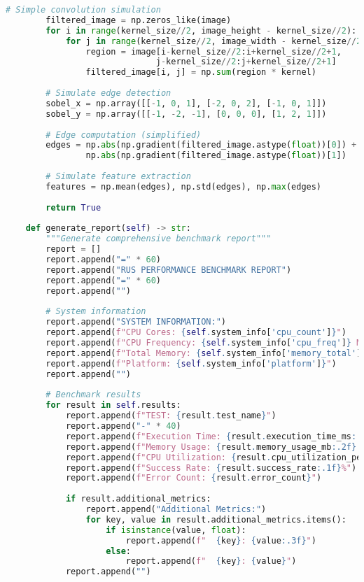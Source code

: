 \begin{lstlisting}[language=Python, caption={Performance Benchmark Script}, label={lst:app-benchmark-script}]
        # Simple convolution simulation
        filtered_image = np.zeros_like(image)
        for i in range(kernel_size//2, image_height - kernel_size//2):
            for j in range(kernel_size//2, image_width - kernel_size//2):
                region = image[i-kernel_size//2:i+kernel_size//2+1, 
                              j-kernel_size//2:j+kernel_size//2+1]
                filtered_image[i, j] = np.sum(region * kernel)
        
        # Simulate edge detection
        sobel_x = np.array([[-1, 0, 1], [-2, 0, 2], [-1, 0, 1]])
        sobel_y = np.array([[-1, -2, -1], [0, 0, 0], [1, 2, 1]])
        
        # Edge computation (simplified)
        edges = np.abs(np.gradient(filtered_image.astype(float))[0]) + \
                np.abs(np.gradient(filtered_image.astype(float))[1])
        
        # Simulate feature extraction
        features = np.mean(edges), np.std(edges), np.max(edges)
        
        return True
    
    def generate_report(self) -> str:
        """Generate comprehensive benchmark report"""
        report = []
        report.append("=" * 60)
        report.append("RUS PERFORMANCE BENCHMARK REPORT")
        report.append("=" * 60)
        report.append("")
        
        # System information
        report.append("SYSTEM INFORMATION:")
        report.append(f"CPU Cores: {self.system_info['cpu_count']}")
        report.append(f"CPU Frequency: {self.system_info['cpu_freq']} MHz")
        report.append(f"Total Memory: {self.system_info['memory_total']:.1f} GB")
        report.append(f"Platform: {self.system_info['platform']}")
        report.append("")
        
        # Benchmark results
        for result in self.results:
            report.append(f"TEST: {result.test_name}")
            report.append("-" * 40)
            report.append(f"Execution Time: {result.execution_time_ms:.3f} ms")
            report.append(f"Memory Usage: {result.memory_usage_mb:.2f} MB")
            report.append(f"CPU Utilization: {result.cpu_utilization_percent:.1f}%")
            report.append(f"Success Rate: {result.success_rate:.1f}%")
            report.append(f"Error Count: {result.error_count}")
            
            if result.additional_metrics:
                report.append("Additional Metrics:")
                for key, value in result.additional_metrics.items():
                    if isinstance(value, float):
                        report.append(f"  {key}: {value:.3f}")
                    else:
                        report.append(f"  {key}: {value}")
            report.append("")
        

\end{lstlisting}
